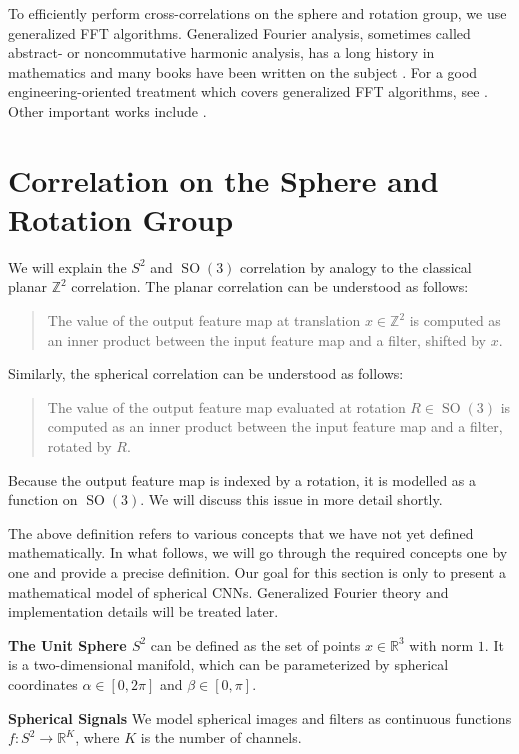 \documentclass{article} %
\newcommand{\Z}{\mathbb{Z}}
\newcommand{\R}{\mathbb{R}}
\newcommand{\SO}[1]{\ensuremath{\operatorname{SO}(#1)}}
\begin{document}
To efficiently perform cross-correlations on the sphere and rotation group, we use generalized FFT algorithms.
Generalized Fourier analysis, sometimes called abstract- or noncommutative harmonic analysis, has a long history in mathematics and many books have been written on the subject \citep{Sugiura1976, Taylor1986, Folland1995}.
For a good engineering-oriented treatment which covers generalized FFT algorithms, see \citep{Chirikjian2001}.
Other important works include \citep{Driscoll1994, Healy2003, Potts1998, Kunis2003, Drake2008, Maslen1998, Rockmore2004, Kostelec2007, Kostelec2008, Potts2009,Makadia2007-fv,Gutman2008-fa}.


\section{Correlation on the Sphere and Rotation Group}

We will explain the $S^2$ and $\SO3$ correlation by analogy to the classical planar $\Z^2$ correlation.
The planar correlation can be understood as follows:
\begin{quote}
The value of the output feature map at translation $x \in \Z^2$ is computed as an inner product between the input feature map and a filter, shifted by $x$.
\end{quote}
Similarly, the spherical correlation can be understood as follows:
\begin{quote}
The value of the output feature map evaluated at rotation $R \in \SO3$ is computed as an inner product between the input feature map and a filter, rotated by $R$.
\end{quote}
Because the output feature map is indexed by a rotation, it is modelled as a function on $\SO3$.
We will discuss this issue in more detail shortly.

The above definition refers to various concepts that we have not yet defined mathematically.
In what follows, we will go through the required concepts one by one and provide a precise definition.
Our goal for this section is only to present a mathematical model of spherical CNNs.
Generalized Fourier theory and implementation details will be treated later.

{\bf The Unit Sphere $S^2$} can be defined as the set of points $x \in \R^3$ with norm $1$.
It is a two-dimensional manifold, which can be parameterized by spherical coordinates $\alpha \in [0, 2\pi]$ and $\beta \in [0, \pi]$. %

{\bf Spherical Signals} We model spherical images and filters as continuous functions $f : S^2 \rightarrow \R^K$, where $K$ is the number of channels.
\end{document}
